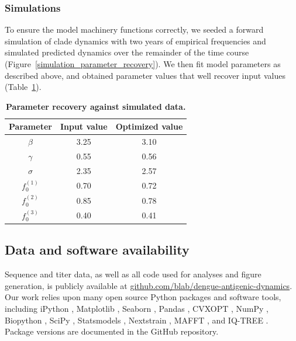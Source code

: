\documentclass[11pt,oneside,letterpaper]{article}
\begin{document}
\subsubsection*{Simulations}
To ensure the model machinery functions correctly, we seeded a forward simulation of clade dynamics with two years of empirical frequencies and simulated predicted dynamics over the remainder of the time course (Figure~\ref{simulation_parameter_recovery}).
We then fit model parameters as described above, and obtained parameter values that well recover input values (Table~\ref{simulation_parameters}).

\begin{table}[ht!]
  \centering
  \caption{
    \textbf{Parameter recovery against simulated data.}
  }
  \label{simulation_parameters}
  \begin{tabular}{c c c}
    \hline
    Parameter     & Input value & Optimized value \\
    \hline
    $\beta$       & 3.25        & 3.10 \\
    $\gamma$      & 0.55        & 0.56 \\
    $\sigma$      & 2.35        & 2.57 \\
    $f_{0}^{(1)}$ & 0.70        & 0.72 \\
    $f_{0}^{(2)}$ & 0.85        & 0.78 \\
    $f_{0}^{(3)}$ & 0.40        & 0.41 \\
    \hline
  \end{tabular}
\end{table}


\subsection*{Data and software availability}
Sequence and titer data, as well as all code used for analyses and figure generation, is publicly available at \href{https://github.com/blab/dengue-antigenic-dynamics}{github.com/blab/dengue-antigenic-dynamics}.
Our work relies upon many open source Python packages and software tools, including iPython \citep{perez2007ipython}, Matplotlib \citep{Hunter2007computing}, Seaborn \citep{waskomseaborn}, Pandas \citep{mckinney2010data}, CVXOPT \citep{andersen2013cvxopt}, NumPy \citep{van2011numpy,gao2012implementing}, Biopython \citep{cock2009biopython}, SciPy \citep{jones2001scipy}, Statsmodels \citep{seabold2010statsmodels}, Nextstrain \citep{hadfield2018nextstrain}, MAFFT \citep{katoh2013mafft}, and IQ-TREE \citep{nguyen2014iq}.
Package versions are documented in the GitHub repository.
\end{document}
